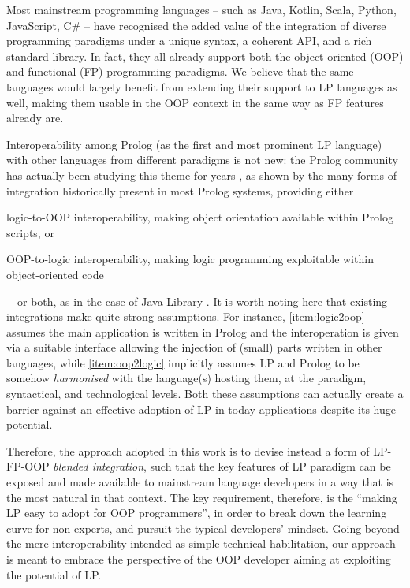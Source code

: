 \documentclass[12pt,a4paper,openright,twoside]{book}
\begin{document}
Most mainstream programming languages -- such as Java, Kotlin, Scala, Python, JavaScript, C\# -- have recognised the added value of the integration of diverse programming paradigms under a unique syntax, a coherent API, and a rich standard library.
%
In fact, they all already support both the object-oriented (OOP) and functional (FP) programming paradigms.
%
We believe that the same languages would largely benefit from extending their support to LP languages as well, making them usable in the OOP context in the same way as FP features already are.

Interoperability among Prolog \cite{ColmerauerR93} (as the first and most prominent LP language) with other languages from different paradigms is not new: the Prolog community has actually been studying this theme for years \cite{Bagnara2002}, as shown by the many forms of integration historically present in most Prolog systems, providing either
%
\begin{inlinelist}
    \item\label{item:logic2oop} logic-to-OOP interoperability, making object orientation available within Prolog scripts, or
    \item\label{item:oop2logic} OOP-to-logic interoperability, making logic programming exploitable within object-oriented code
\end{inlinelist}%
%
---or both, as in the case of \tuprolog{} Java Library \cite{tuprolog-scp57}.
%
It is worth noting here that existing integrations make quite strong assumptions.
%
For instance, \cref{item:logic2oop} assumes the main application is written in Prolog and the interoperation is given via a suitable interface allowing the injection of (small) parts written in other languages, while \cref{item:oop2logic} implicitly assumes LP and Prolog to be somehow \emph{harmonised} with the language(s) hosting them, at the paradigm, syntactical, and technological levels.
%
Both these assumptions can actually create a barrier against an effective adoption of LP in today applications despite its huge potential.

Therefore, the approach adopted in this work is to devise instead a form of LP-FP-OOP \emph{blended integration}, such that the key features of LP paradigm can be exposed and made available to mainstream language developers in a way that is the most natural in that context.
%
The key requirement, therefore, is the ``making LP easy to adopt for OOP programmers'', in order to break down the learning curve for non-experts, and pursuit the typical developers' mindset.
%
Going beyond the mere interoperability intended as simple technical habilitation, our approach is meant to embrace the perspective of the OOP developer aiming at exploiting the potential of LP.
\end{document}
